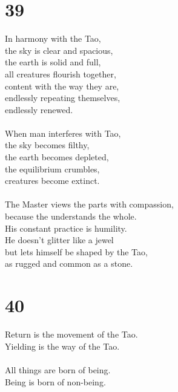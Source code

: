 \documentclass[b5paper, 12pt, oneside]{book}
\begin{document}
\chapter*{39}
In harmony with the Tao,\\
the sky is clear and spacious,\\
the earth is solid and full,\\
all creatures flourish together,\\
content with the way they are,\\
endlessly repeating themselves,\\
endlessly renewed.\\
\\
When man interferes with Tao,\\
the sky becomes filthy,\\
the earth becomes depleted,\\
the equilibrium crumbles,\\
creatures become extinct.\\
\\
The Master views the parts with compassion,\\
because the understands the whole.\\
His constant practice is humility.\\
He doesn't glitter like a jewel\\
but lets himself be shaped by the Tao,\\
as rugged and common as a stone.\\

\chapter*{40}
Return is the movement of the Tao.\\
Yielding is the way of the Tao.\\
\\
All things are born of being.\\
Being is born of non-being.\\
\end{document}
